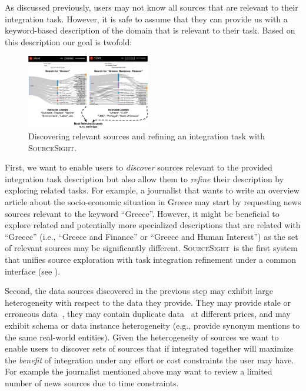 \documentclass{vldb}
\newcommand\system{\textsc{SourceSight}}
\begin{document}
As discussed previously, users may not know all sources that are relevant to their integration task. However, it is safe to assume that they can provide us with a keyword-based description of the domain that is relevant to their task. Based on this description our goal is twofold: 

\begin{figure}
	\begin{center}
	\includegraphics[trim=0 0 0 60, clip,width=0.48\textwidth]{fig/exploreCor}
	\caption{Discovering relevant sources and refining an integration task with \system.}
	\label{fig:exploration}
	\end{center}
	\vspace{-20pt}
\end{figure}


First, we want to enable users to {\em discover} sources relevant to the provided integration task description but also allow them to {\em refine} their description by exploring related tasks. For example, a journalist that wants to write an overview article about the socio-economic situation in Greece may start by requesting news sources relevant to the keyword ``Greece''. However, it might be beneficial to explore related and potentially more specialized descriptions that are related with ``Greece'' (i.e., ``Greece and Finance'' or ``Greece and Human Interest'') as the set of relevant sources may be significantly different. \system~is the first system that unifies source exploration with task integration refinement under a common interface (see ).

Second, the data sources discovered in the previous step may exhibit large heterogeneity with respect to the data they provide. They may provide stale or erroneous data~\cite{Dong_vldb:2009, li:2012}, they may contain duplicate data~\cite{bronzi:2013, li:2012} at different prices, and may exhibit schema or data instance heterogeneity (e.g., provide synonym mentions to the same real-world entities). Given the heterogeneity of sources we want to enable users to discover sets of sources that if integrated together will maximize the {\em benefit} of integration under any effort or cost constraints the user may have. For example the journalist mentioned above may want to review a limited number of news sources due to time constraints. 
\end{document}

